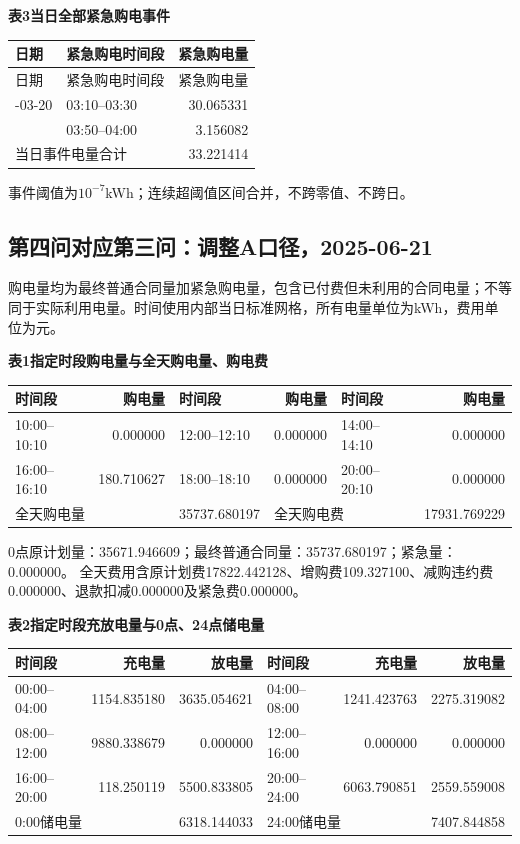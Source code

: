 \begin{center}\textbf{表3\quad 当日全部紧急购电事件}\end{center}
\begin{longtable}{llr}\toprule 日期 & 紧急购电时间段 & 紧急购电量\\\midrule\endfirsthead
\toprule 日期 & 紧急购电时间段 & 紧急购电量\\\midrule\endhead
\bottomrule\endfoot
2025-03-20 & 03:10--03:30 & 30.065331\\
 & 03:50--04:00 & 3.156082\\
\midrule\multicolumn{2}{l}{当日事件电量合计} & 33.221414\\
\end{longtable}
\noindent 事件阈值为$10^{-7}$kWh；连续超阈值区间合并，不跨零值、不跨日。
\endgroup
\clearpage
\subsection{第四问对应第三问：调整A口径，2025-06-21}
\begingroup\small
\setlength{\tabcolsep}{4pt}\renewcommand{\arraystretch}{1.08}
\setlength{\LTpre}{4pt}\setlength{\LTpost}{4pt}
\noindent 购电量均为最终普通合同量加紧急购电量，包含已付费但未利用的合同电量；不等同于实际利用电量。时间使用内部当日标准网格，所有电量单位为kWh，费用单位为元。
\begin{center}\textbf{表1\quad 指定时段购电量与全天购电量、购电费}\par\smallskip
\begin{tabular}{lr lr lr}\toprule
时间段 & 购电量 & 时间段 & 购电量 & 时间段 & 购电量\\\midrule
10:00--10:10 & 0.000000 & 12:00--12:10 & 0.000000 & 14:00--14:10 & 0.000000\\
16:00--16:10 & 180.710627 & 18:00--18:10 & 0.000000 & 20:00--20:10 & 0.000000\\
\midrule
\multicolumn{2}{l}{全天购电量} & 35737.680197 & \multicolumn{2}{l}{全天购电费} & 17931.769229\\
\bottomrule\end{tabular}\end{center}
\noindent 0点原计划量：35671.946609；最终普通合同量：35737.680197；紧急量：0.000000。
全天费用含原计划费17822.442128、增购费109.327100、减购违约费0.000000、退款扣减0.000000及紧急费0.000000。
\begin{center}\textbf{表2\quad 指定时段充放电量与0点、24点储电量}\par\smallskip
\begin{tabular}{lrr lrr}\toprule
时间段 & 充电量 & 放电量 & 时间段 & 充电量 & 放电量\\\midrule
00:00--04:00 & 1154.835180 & 3635.054621 & 04:00--08:00 & 1241.423763 & 2275.319082\\
08:00--12:00 & 9880.338679 & 0.000000 & 12:00--16:00 & 0.000000 & 0.000000\\
16:00--20:00 & 118.250119 & 5500.833805 & 20:00--24:00 & 6063.790851 & 2559.559008\\
\midrule
\multicolumn{2}{l}{0:00储电量} & 6318.144033 & \multicolumn{2}{l}{24:00储电量} & 7407.844858\\
\bottomrule\end{tabular}\end{center}
